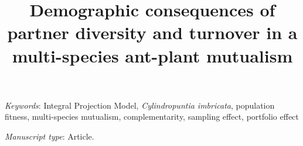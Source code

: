\documentclass[11pt]{article}
\title{Demographic consequences of partner diversity and turnover in a multi-species ant-plant mutualism}
\date{}
\begin{document}
	
	\maketitle
	
	
	
	\bigskip
	
	\textit{Keywords}: Integral Projection Model, \textit{Cylindropuntia imbricata}, population fitness, multi-species mutualism, complementarity, sampling effect, portfolio effect
	
	\bigskip
	
	\textit{Manuscript type}: Article.
	
	\bigskip
	
	
\linenumbers{}
\modulolinenumbers[3]

\newpage{}
\end{document}
